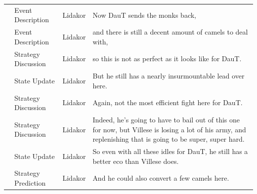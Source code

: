 {\begin{longtable}{@{}>{\theAppRow}r|L{2.3cm}L{1.0cm}U{11.55cm}@{}}
    & Event Description     & Lidakor & Now DauT sends the monks back,                                                                                                                                                                                                                                                                  \\
    & Event Description     & Lidakor & and there is still a decent amount of camels to deal with,                                                                                                                                                                                                                                      \\
    & Strategy Discussion   & Lidakor & so this is not as perfect as it looks like for DauT.                                                                                                                                                                                                                                            \\
    & State Update          & Lidakor & But he still has a nearly insurmountable lead over here.                                                                                                                                                                                                                                        \\
    & Strategy Discussion   & Lidakor & Again, not the most efficient fight here for DauT.                                                                                                                                                                                                                                              \\
    & Strategy Discussion   & Lidakor & Indeed, he's going to have to bail out of this one for now, but Villese is losing a lot of his army, and replenishing that is going to be super, super hard.                                                                                                                                    \\
    & State Update          & Lidakor & So even with all these idles for DauT, he still has a better eco than Villese does.                                                                                                                                                                                                             \\
    & Strategy Prediction   & Lidakor & And he could also convert a few camels here.                                                                                                                                                                                                                                                    \\

\end{longtable}}
